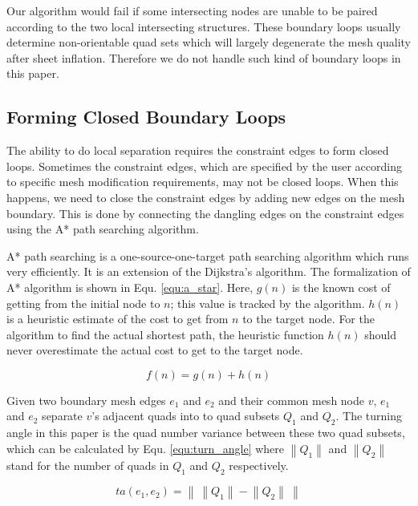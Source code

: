 \documentclass[final,5p,times,twocolumn]{elsarticle}
\begin{document}
Our algorithm would fail if some intersecting nodes are unable to be paired according to the two local intersecting structures. These boundary loops usually determine non-orientable quad sets\cite{Suzuki:2010hn} which will largely degenerate the mesh quality after sheet inflation. Therefore we do not handle such kind of boundary loops in this paper.

\subsection{Forming Closed Boundary Loops}
\label{sec:close_bound_loop}
The ability to do local separation requires the constraint edges to form closed loops. Sometimes the constraint edges, which are specified by the user according to specific mesh modification requirements, may not be closed loops. When this happens, we need to close the constraint edges by adding new edges on the mesh boundary. This is done by connecting the dangling edges on the constraint edges using the A* path searching algorithm.

A* path searching is a one-source-one-target path searching algorithm which runs very efficiently\cite{hart1968formal}. It is an extension of the Dijkstra's algorithm\cite{Dijkstra1959A}. The formalization of A* algorithm is shown in Equ. \ref{equ:a_star}. Here, $g(n)$ is the known cost of getting from the initial node to $n$; this value is tracked by the algorithm. $h(n)$ is a heuristic estimate of the cost to get from $n$ to the target node. For the algorithm to find the actual shortest path, the heuristic function $h(n)$ should never overestimate the actual cost to get to the target node.

\begin{equation}
\label{equ:a_star}
f(n)=g(n) + h(n)
\end{equation}

Given two boundary mesh edges $e_1$ and $e_2$ and their common mesh node $v$, $e_1$ and $e_2$ separate $v$'s adjacent quads into to quad subsets $Q_1$ and $Q_2$. The turning angle in this paper is the quad number variance between these two quad subsets, which can be calculated by Equ. \ref{equ:turn_angle} where $\left \| Q_1 \right \|$ and $\left \| Q_2 \right \|$ stand for the number of quads in $Q_1$ and $Q_2$ respectively.

\begin{equation}
\label{equ:turn_angle}
ta(e_1,e_2)=\left \| ~ \left \| Q_1 \right \| - \left \| Q_2 \right \| ~ \right \|
\end{equation}
\end{document}
